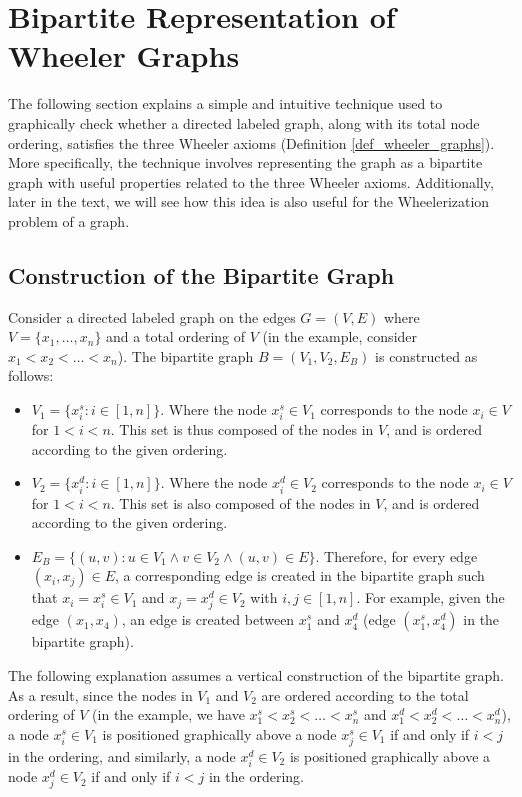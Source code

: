 \begingroup
\sloppy
\raggedright
\section{Bipartite Representation of Wheeler Graphs} \label{rapp_bipartita}
\endgroup
The following section explains a simple and intuitive technique used to graphically check whether a directed labeled graph, along with its total node ordering, satisfies the three Wheeler axioms (Definition \ref{def_wheeler_graphs}). More specifically, the technique involves representing the graph as a bipartite graph with useful properties related to the three Wheeler axioms. Additionally, later in the text, we will see how this idea is also useful for the Wheelerization problem of a graph.

\subsection{Construction of the Bipartite Graph}
Consider a directed labeled graph on the edges $G=(V,E)$ where $V=\{x_1,\dots,x_n\}$ and a total ordering of $V$ (in the example, consider $x_1<x_2<\dots<x_n$). The bipartite graph $B=(V_1,V_2,E_B)$ is constructed as follows:

\begin{itemize}
    \item $V_1=\{x_i^s : i \in [1, n]\}$. Where the node $x_i^s \in V_1$ corresponds to the node $x_i \in V$ for $1 < i < n$. This set is thus composed of the nodes in $V$, and is ordered according to the given ordering.
    \item $V_2=\{x_i^d : i \in [1, n]\}$. Where the node $x_i^d \in V_2$ corresponds to the node $x_i \in V$ for $1 < i < n$. This set is also composed of the nodes in $V$, and is ordered according to the given ordering.
    \item $E_B=\{(u, v) : u \in V_1 \wedge v \in V_2 \wedge (u,v) \in E\}$. Therefore, for every edge $(x_i,x_j) \in E$, a corresponding edge is created in the bipartite graph such that $x_i = x_i^s \in V_1$ and $x_j=x_j^d \in V_2$ with $i, j \in [1, n]$. For example, given the edge $(x_1, x_4)$, an edge is created between $x_1^s$ and $x_4^d$ (edge $(x_1^s,x_4^d)$ in the bipartite graph).
\end{itemize}

The following explanation assumes a vertical construction of the bipartite graph. As a result, since the nodes in $V_1$ and $V_2$ are ordered according to the total ordering of $V$ (in the example, we have $x_1^s<x_2^s<\dots<x_n^s$ and $x_1^d<x_2^d<\dots<x_n^d$), a node $x_i^s \in V_1$ is positioned graphically above a node $x_j^s \in V_1$ if and only if $i < j$ in the ordering, and similarly, a node $x_i^d \in V_2$ is positioned graphically above a node $x_j^d \in V_2$ if and only if $i < j$ in the ordering.

